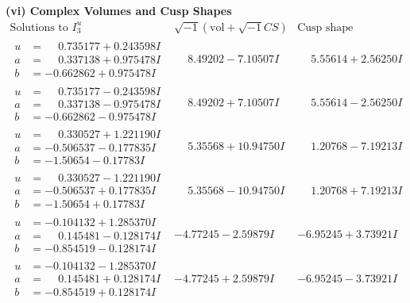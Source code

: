 \documentclass[1p]{elsarticle_modified}
\theoremstyle{definition}
\newcommand{\I}{\sqrt{-1}}
\begin{document}
\newpage\flushleft \textbf{(vi) Complex Volumes and Cusp Shapes}
$$\begin{array}{c|c|c}  
\text{Solutions to }I^u_{3}& \I (\text{vol} + \sqrt{-1}CS) & \text{Cusp shape}\\
 \hline 
\begin{aligned}
u &= \phantom{-}0.735177 + 0.243598 I \\
a &= \phantom{-}0.337138 + 0.975478 I \\
b &= -0.662862 + 0.975478 I\end{aligned}
 & \phantom{-}8.49202 - 7.10507 I & \phantom{-}5.55614 + 2.56250 I \\ \hline\begin{aligned}
u &= \phantom{-}0.735177 - 0.243598 I \\
a &= \phantom{-}0.337138 - 0.975478 I \\
b &= -0.662862 - 0.975478 I\end{aligned}
 & \phantom{-}8.49202 + 7.10507 I & \phantom{-}5.55614 - 2.56250 I \\ \hline\begin{aligned}
u &= \phantom{-}0.330527 + 1.221190 I \\
a &= -0.506537 - 0.177835 I \\
b &= -1.50654 - 0.17783 I\end{aligned}
 & \phantom{-}5.35568 + 10.94750 I & \phantom{-}1.20768 - 7.19213 I \\ \hline\begin{aligned}
u &= \phantom{-}0.330527 - 1.221190 I \\
a &= -0.506537 + 0.177835 I \\
b &= -1.50654 + 0.17783 I\end{aligned}
 & \phantom{-}5.35568 - 10.94750 I & \phantom{-}1.20768 + 7.19213 I \\ \hline\begin{aligned}
u &= -0.104132 + 1.285370 I \\
a &= \phantom{-}0.145481 - 0.128174 I \\
b &= -0.854519 - 0.128174 I\end{aligned}
 & -4.77245 - 2.59879 I & -6.95245 + 3.73921 I \\ \hline\begin{aligned}
u &= -0.104132 - 1.285370 I \\
a &= \phantom{-}0.145481 + 0.128174 I \\
b &= -0.854519 + 0.128174 I\end{aligned}
 & -4.77245 + 2.59879 I & -6.95245 - 3.73921 I \\ \hline\begin{aligned}

\end{aligned}
\end{array}$$
\end{document}
